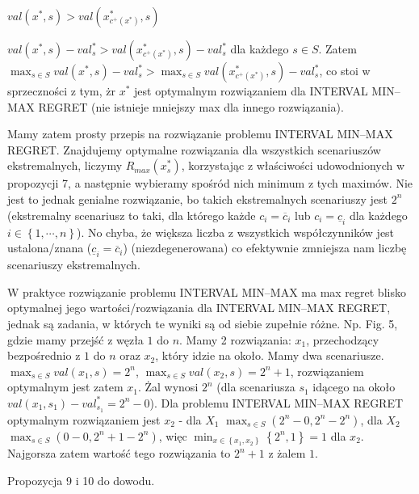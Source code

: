 $val \left( x^{\ast}, s \right) > val \left( x^{\ast}_{c^{+} \left( x^{\ast} \right)}, s \right)$

$val \left( x^{\ast}, s \right) - val^{\ast}_{s} > val \left( x^{\ast}_{c^{+} \left( x^{\ast} \right)}, s \right) - val^{\ast}_{s}$ dla każdego $s \in S$. Zatem $\max_{s \in S} val \left( x^{\ast}, s \right) - val^{\ast}_{s} > \max_{s \in S} val \left( x^{\ast}_{c^{+} \left( x^{\ast} \right)}, s \right) - val^{\ast}_{s}$, co stoi w sprzeczności z tym, żr $x^{\ast}$ jest optymalnym rozwiązaniem dla INTERVAL MIN–MAX REGRET (nie istnieje mniejszy max dla innego rozwiązania).

Mamy zatem prosty przepis na rozwiązanie problemu INTERVAL MIN–MAX REGRET. Znajdujemy optymalne rozwiązania dla wszystkich scenariuszów ekstremalnych, liczymy $R_{max} \left( x_{s}^{\ast} \right)$, korzystając z właściwości udowodnionych w propozycji 7, a następnie wybieramy spośród nich minimum z tych maximów. Nie jest to jednak genialne rozwiązanie, bo takich ekstremalnych scenariuszy jest $2^{n}$ (ekstremalny scenariusz to taki, dla którego każde $c_{i} = \overline{c}_{i}$ lub $c_{i} = \underline{c}_{i}$ dla każdego $i \in \left\{ 1, \cdots, n \right\}$).
No chyba, że większa liczba z wszystkich współczynników jest ustalona/znana ($\underline{c}_{i} = \overline{c}_{i}$) (niezdegenerowana) co efektywnie zmniejsza nam liczbę scenariuszy ekstremalnych.

W praktyce rozwiązanie problemu INTERVAL MIN–MAX ma max regret blisko optymalnej jego wartości/rozwiązania dla INTERVAL MIN–MAX REGRET, jednak są zadania, w których te wyniki są od siebie zupełnie różne. Np. Fig. 5, gdzie mamy przejść z węzła $1$ do $n$. Mamy 2 rozwiązania: $x_{1}$, przechodzący bezpośrednio z $1$ do $n$ oraz $x_{2}$, który idzie na około. Mamy dwa scenariusze. $\max_{s \in S} val \left( x_{1}, s \right) = 2^{n}$, $\max_{s \in S} val \left( x_{2}, s \right) = 2^{n} + 1$, rozwiązaniem optymalnym jest zatem $x_{1}$. Żal wynosi $2^{n}$ (dla scenariusza $s_{1}$ idącego na około $val \left( x_{1}, s_{1} \right) - val^{*}_{s_{1}} = 2^{n} - 0$). Dla problemu INTERVAL MIN–MAX REGRET optymalnym rozwiązaniem jest $x_{2}$ - dla $X_{1}$ $\max_{s \in S} \left( 2^n - 0, 2^n - 2^n \right)$, dla $X_{2}$ $\max_{s \in S} \left( 0 - 0, 2^n + 1 - 2^n \right)$, więc $\min_{x \in \left\{ x_{1}, x_{2} \right\}} \left\{ 2^n, 1 \right\} = 1$ dla $x_{2}$. Najgorsza zatem wartość tego rozwiązania to $2^n + 1$ z żalem $1$.

Propozycja 9 i 10 do dowodu.
